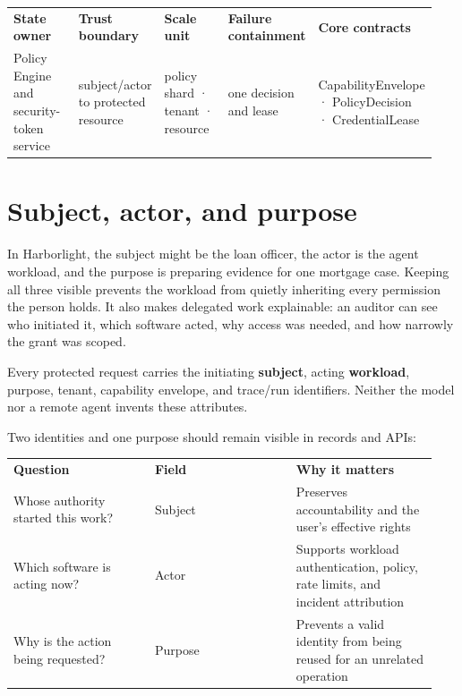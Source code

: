 \BookTableStart
\fontsize{7.2}{9}\selectfont
\begin{tabular}{@{}Y{0.1880\linewidth}Y{0.1880\linewidth}Y{0.1880\linewidth}Y{0.1880\linewidth}Y{0.1880\linewidth}@{}}
\color{white}\bfseries \textbf{State owner} & \color{white}\bfseries \textbf{Trust boundary} & \color{white}\bfseries \textbf{Scale unit} & \color{white}\bfseries \textbf{Failure containment} & \color{white}\bfseries \textbf{Core contracts} \\
Policy Engine and security-token service & subject/actor to protected resource & policy shard · tenant · resource & one decision and lease & CapabilityEnvelope · PolicyDecision · CredentialLease \\
\end{tabular}
\BookTableEnd

\section{Subject, actor, and purpose}

In Harborlight, the subject might be the loan officer, the actor is the agent workload, and the purpose is preparing evidence for one mortgage case. Keeping all three visible prevents the workload from quietly inheriting every permission the person holds. It also makes delegated work explainable: an auditor can see who initiated it, which software acted, why access was needed, and how narrowly the grant was scoped.\par

Every protected request carries the initiating \textbf{subject}, acting \textbf{workload}, purpose, tenant, capability envelope, and trace/run identifiers. Neither the model nor a remote agent invents these attributes.\par

Two identities and one purpose should remain visible in records and APIs:\par

\BookTableStart
\small
\begin{tabular}{@{}Y{0.3133\linewidth}Y{0.3133\linewidth}Y{0.3133\linewidth}@{}}
\color{white}\bfseries \textbf{Question} & \color{white}\bfseries \textbf{Field} & \color{white}\bfseries \textbf{Why it matters} \\
Whose authority started this work? & Subject & Preserves accountability and the user’s effective rights \\
Which software is acting now? & Actor & Supports workload authentication, policy, rate limits, and incident attribution \\
Why is the action being requested? & Purpose & Prevents a valid identity from being reused for an unrelated operation \\
\end{tabular}
\BookTableEnd

